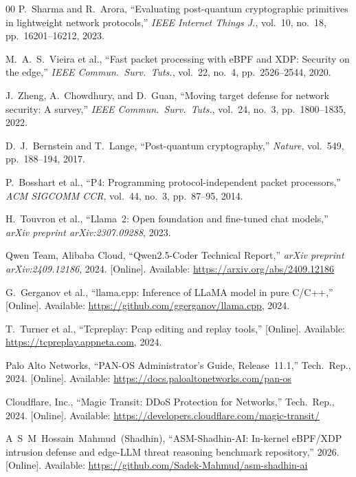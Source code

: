 \documentclass[journal]{IEEEtran}
\renewcommand{\_}{\textunderscore\allowbreak}
\begin{document}
\begin{thebibliography}{00}
P.~Sharma and R.~Arora, ``Evaluating post-quantum cryptographic primitives in
lightweight network protocols,'' \emph{IEEE Internet Things J.}, vol.~10, no.~18,
pp.~16201--16212, 2023.

M.~A.~S.~Vieira et al., ``Fast packet processing with eBPF and XDP: Security on
the edge,'' \emph{IEEE Commun.\ Surv.\ Tuts.}, vol.~22, no.~4, pp.~2526--2544,
2020.

J.~Zheng, A.~Chowdhury, and D.~Guan, ``Moving target defense for network security:
A survey,'' \emph{IEEE Commun.\ Surv.\ Tuts.}, vol.~24, no.~3, pp.~1800--1835,
2022.

D.~J.~Bernstein and T.~Lange, ``Post-quantum cryptography,'' \emph{Nature},
vol.~549, pp.~188--194, 2017.

P.~Bosshart et al., ``P4: Programming protocol-independent packet processors,''
\emph{ACM SIGCOMM CCR}, vol.~44, no.~3, pp.~87--95, 2014.

H.~Touvron et al., ``Llama~2: Open foundation and fine-tuned chat models,''
\emph{arXiv preprint arXiv:2307.09288}, 2023.

Qwen Team, Alibaba Cloud, ``Qwen2.5-Coder Technical Report,''
\emph{arXiv preprint arXiv:2409.12186}, 2024. [Online]. Available:
\url{https://arxiv.org/abs/2409.12186}

G.~Gerganov et al., ``llama.cpp: Inference of LLaMA model in pure C/C++,''
[Online]. Available: \url{https://github.com/ggerganov/llama.cpp}, 2024.

T.~Turner et al., ``Tcpreplay: Pcap editing and replay tools,''
[Online]. Available: \url{https://tcpreplay.appneta.com}, 2024.

Palo Alto Networks, ``PAN-OS Administrator's Guide, Release~11.1,''
Tech.\ Rep., 2024. [Online]. Available:
\url{https://docs.paloaltonetworks.com/pan-os}

Cloudflare, Inc., ``Magic Transit: DDoS Protection for Networks,''
Tech.\ Rep., 2024. [Online]. Available:
\url{https://developers.cloudflare.com/magic-transit/}

A~S~M~Hossain~Mahmud~(Shadhin), ``ASM-Shadhin-AI: In-kernel eBPF/XDP intrusion defense and edge-LLM threat reasoning benchmark repository,'' 2026. [Online]. Available: \url{https://github.com/Sadek-Mahmud/asm-shadhin-ai}

\end{thebibliography}
\end{document}
